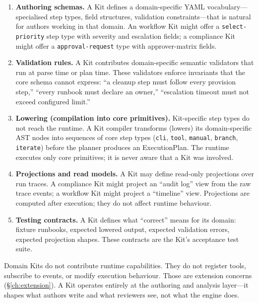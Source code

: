 \begin{enumerate}
  \item \textbf{Authoring schemas.}  A Kit defines a domain-specific YAML
    vocabulary---specialised step types, field structures, validation
    constraints---that is natural for authors working in that domain.  An
    workflow Kit might offer a \texttt{select-priority} step type with severity
    and escalation fields; a compliance Kit might offer a
    \texttt{approval-request} type with approver-matrix fields.

  \item \textbf{Validation rules.}  A Kit contributes domain-specific semantic
    validators that run at parse time or plan time.  These validators enforce
    invariants that the core schema cannot express: ``a cleanup step must
    follow every provision step,'' ``every runbook must declare an owner,''
    ``escalation timeout must not exceed configured limit.''

  \item \textbf{Lowering (compilation into core primitives).}  Kit-specific
    step types do not reach the runtime.  A Kit compiler transforms (lowers)
    its domain-specific AST nodes into sequences of core step types
    (\texttt{cli}, \texttt{tool}, \texttt{manual}, \texttt{branch},
    \texttt{iterate}) before the planner produces an ExecutionPlan.  The
    runtime executes only core primitives; it is never aware that a Kit was
    involved.

  \item \textbf{Projections and read models.}  A Kit may define read-only
    projections over run traces.  A compliance Kit might project an ``audit
    log'' view from the raw trace events; a workflow Kit might project a
    ``timeline'' view.  Projections are computed after execution; they do not
    affect runtime behaviour.

  \item \textbf{Testing contracts.}  A Kit defines what ``correct'' means for
    its domain: fixture runbooks, expected lowered output, expected validation
    errors, expected projection shapes.  These contracts are the Kit's
    acceptance test suite.
\end{enumerate}

Domain Kits do not contribute runtime capabilities.  They do not register
tools, subscribe to events, or modify execution behaviour.  Those are extension
concerns (\S\ref{ch:extension}).  A Kit operates entirely at the authoring and
analysis layer---it shapes what authors write and what reviewers see, not what
the engine does.

